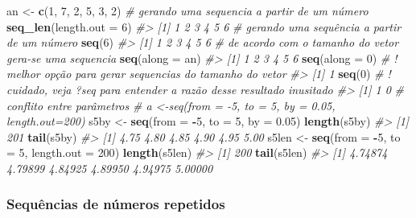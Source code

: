 \documentclass[]{book}
\newenvironment{Shaded}{\begin{snugshade}}{\end{snugshade}}
\newcommand{\KeywordTok}[1]{\textcolor[rgb]{0.13,0.29,0.53}{\textbf{#1}}}
\newcommand{\DataTypeTok}[1]{\textcolor[rgb]{0.13,0.29,0.53}{#1}}
\newcommand{\DecValTok}[1]{\textcolor[rgb]{0.00,0.00,0.81}{#1}}
\newcommand{\FloatTok}[1]{\textcolor[rgb]{0.00,0.00,0.81}{#1}}
\newcommand{\StringTok}[1]{\textcolor[rgb]{0.31,0.60,0.02}{#1}}
\newcommand{\CommentTok}[1]{\textcolor[rgb]{0.56,0.35,0.01}{\textit{#1}}}
\newcommand{\OperatorTok}[1]{\textcolor[rgb]{0.81,0.36,0.00}{\textbf{#1}}}
\newcommand{\NormalTok}[1]{#1}
\begin{document}
\begin{Shaded}
\begin{Highlighting}[]
\NormalTok{an <-}\StringTok{ }\KeywordTok{c}\NormalTok{(}\DecValTok{1}\NormalTok{, }\DecValTok{7}\NormalTok{, }\DecValTok{2}\NormalTok{, }\DecValTok{5}\NormalTok{, }\DecValTok{3}\NormalTok{, }\DecValTok{2}\NormalTok{)}
\CommentTok{# gerando uma sequencia a partir de um número}
\KeywordTok{seq_len}\NormalTok{(}\DataTypeTok{length.out =} \DecValTok{6}\NormalTok{)}
\CommentTok{#> [1] 1 2 3 4 5 6}
\CommentTok{# gerando uma sequência a partir de um número}
\KeywordTok{seq}\NormalTok{(}\DecValTok{6}\NormalTok{)}
\CommentTok{#> [1] 1 2 3 4 5 6}
\CommentTok{# de acordo com o tamanho do vetor gera-se uma sequencia}
\KeywordTok{seq}\NormalTok{(}\DataTypeTok{along =}\NormalTok{ an)}
\CommentTok{#> [1] 1 2 3 4 5 6}
\KeywordTok{seq}\NormalTok{(}\DataTypeTok{along =} \DecValTok{0}\NormalTok{) }\CommentTok{# ! melhor opção para gerar sequencias do tamanho do vetor}
\CommentTok{#> [1] 1}
\KeywordTok{seq}\NormalTok{(}\DecValTok{0}\NormalTok{) }\CommentTok{# ! cuidado, veja ?seq para entender a razão desse resultado inusitado}
\CommentTok{#> [1] 1 0}
\CommentTok{# conflito entre parâmetros}
\CommentTok{# a <-seq(from = -5, to = 5, by = 0.05, length.out=200)}
\NormalTok{s5by <-}\StringTok{ }\KeywordTok{seq}\NormalTok{(}\DataTypeTok{from =} \OperatorTok{-}\DecValTok{5}\NormalTok{, }\DataTypeTok{to =} \DecValTok{5}\NormalTok{, }\DataTypeTok{by =} \FloatTok{0.05}\NormalTok{)}
\KeywordTok{length}\NormalTok{(s5by)}
\CommentTok{#> [1] 201}
\KeywordTok{tail}\NormalTok{(s5by)}
\CommentTok{#> [1] 4.75 4.80 4.85 4.90 4.95 5.00}
\NormalTok{s5len <-}\StringTok{ }\KeywordTok{seq}\NormalTok{(}\DataTypeTok{from =} \OperatorTok{-}\DecValTok{5}\NormalTok{, }\DataTypeTok{to =} \DecValTok{5}\NormalTok{, }\DataTypeTok{length.out =} \DecValTok{200}\NormalTok{)}
\KeywordTok{length}\NormalTok{(s5len)}
\CommentTok{#> [1] 200}
\KeywordTok{tail}\NormalTok{(s5len)}
\CommentTok{#> [1] 4.74874 4.79899 4.84925 4.89950 4.94975 5.00000}
\end{Highlighting}
\end{Shaded}

\subsubsection{Sequências de números
repetidos}\label{sequencias-de-numeros-repetidos}
\end{document}
